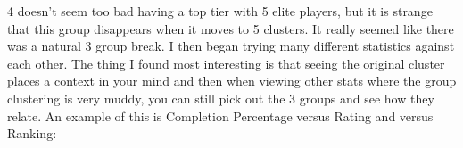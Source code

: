 \documentclass[10pt]{article}
\begin{document}
\hfill
{}%
\par
\par
{}%
\hfill
{}%
\par
4 doesn't seem too bad having a top tier with 5 elite players, but it is strange that this group disappears when it moves to 5 clusters. It really seemed like there was a natural 3 group break. I then began trying many different statistics against each other. The thing I found most interesting is that seeing the original cluster places a context in your mind and then when viewing other stats where the group clustering is very muddy, you can still pick out the 3 groups and see how they relate. An example of this is Completion Percentage versus Rating and versus Ranking:
\par
{}%
\end{document}
